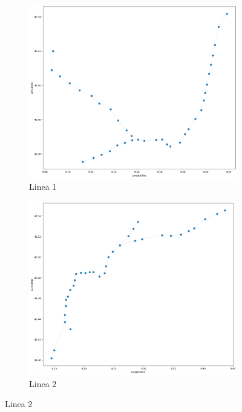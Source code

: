 \vspace{1em}
\begin{figure}[htbp]
  \centering
  \begin{subfigure}[b]{0.40\textwidth}
    \centering
    \includegraphics[width=\textwidth]{Immagini/Capitoli/cap3/rete_1.png}
    \caption{Linea 1}
    \label{fig:m1}
  \end{subfigure}%
  \hspace{0.03\textwidth}
  \begin{subfigure}[b]{0.40\textwidth}
    \centering
    \includegraphics[width=\textwidth]{Immagini/Capitoli/cap3/rete_2.png}
    \caption{Linea 2}
    \label{fig:m2}
  \end{subfigure}


\end{figure}
